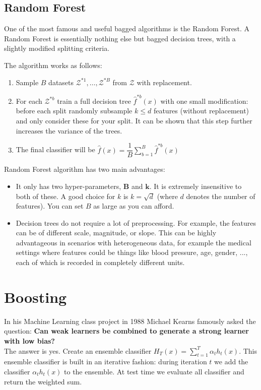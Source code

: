 \documentclass[twoside]{article}
\begin{document}
\subsection{Random Forest}

One of the most famous and useful bagged algorithms is the Random Forest. A Random Forest is essentially nothing else but bagged decision trees, with a slightly modified splitting criteria.

The algorithm works as follows:

\begin{enumerate}
    \item Sample $B$ datasets $\mathcal{Z}^{*1},\ldots,\mathcal{Z}^{*B}$  from $\mathcal{Z}$ with replacement.
    \item For each $\mathcal{Z}^{*b}$ train a full decision tree $\hat{f}^{*b}(x)$ with one small modification: before each split randomly subsample $k \leq d$ features (without replacement) and only consider these for your split.
    It can be shown that this step further increases the variance of the trees.
    \item The final classifier will be $\hat{f}(x) = \dfrac{1}{B} \sum_{b=1}^{B}\hat{f}^{*b}(x)$
\end{enumerate}

Random Forest algorithm has two main advantages:

\begin{itemize}
    \item It only has two hyper-parameters, $\mathbf{B}$ and $\mathbf{k}$. It is extremely insensitive to both of these. A good choice for $k$ is $k=\sqrt{d}$ (where $d$ denotes the number of features). You can set $B$ as large as you can afford.
    \item Decision trees do not require a lot of preprocessing. For example, the features can be of different scale, magnitude, or slope. This can be highly advantageous in scenarios with heterogeneous data, for example the medical settings where features could be things like blood pressure, age, gender, ..., each of which is recorded in completely different units.
\end{itemize}

\section{Boosting}
In his Machine Learning class project in 1988 Michael Kearns famously asked the question: \textbf{Can weak learners be combined to generate a strong learner with low bias?} \\ The answer is yes. Create an ensemble classifier $H_{T}(x) =\sum_{t=1}^{T} \alpha_{t} h_{t}(x)$. This ensemble classifier is built in an iterative fashion: during iteration $t$ we add the classifier $\alpha_{t} h_{t}(x)$ to the ensemble. At test time we evaluate all classifier and return the weighted sum.
\end{document}

